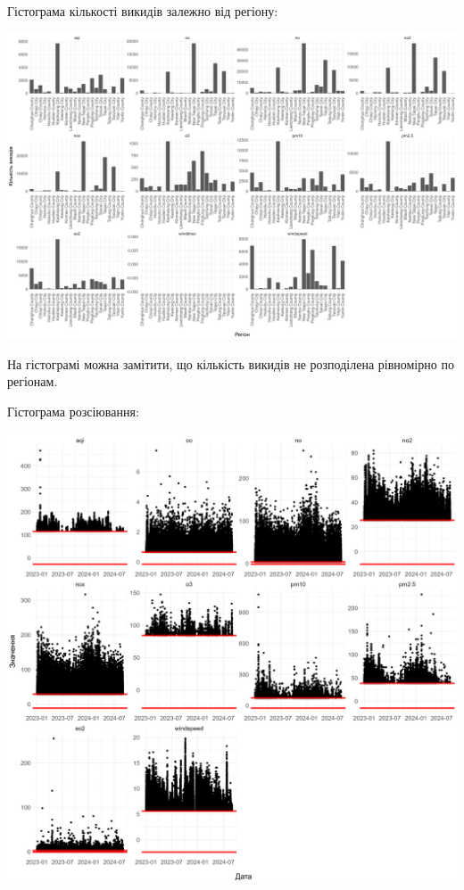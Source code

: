 \documentclass[./report.tex]{subfiles}
\begin{document}
\begin{enumerate}
    Гістограма кількості викидів залежно від регіону:

    \includegraphics[width=6in]{plots/outliers/count-bar-county.png}

    На гістограмі можна замітити, що кількість викидів не розподілена рівномірно
    по регіонам.

    \pagebreak

    Гістограма розсіювання:

    \includegraphics[width=6in]{plots/outliers/scatter.png}


\end{enumerate}
\end{document}

